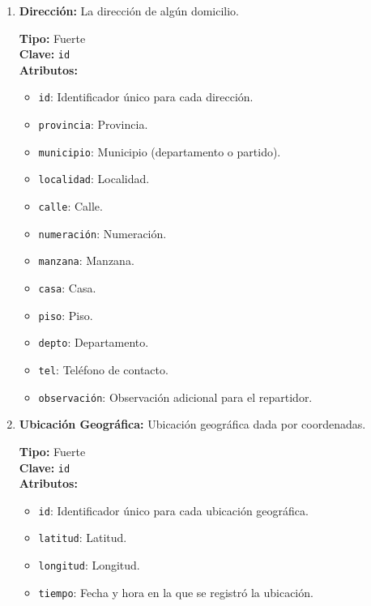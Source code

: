 \begin{enumerate}
    \item \textbf{Dirección:} La dirección de algún domicilio.
    
    \textbf{Tipo:} Fuerte \\
    \textbf{Clave:} \texttt{id} \\
    \textbf{Atributos:}
    \begin{itemize}
        \item \texttt{id}: Identificador único para cada dirección.
        \item \texttt{provincia}: Provincia.
        \item \texttt{municipio}: Municipio (departamento o partido).
        \item \texttt{localidad}: Localidad.
        \item \texttt{calle}: Calle.
        \item \texttt{numeración}: Numeración.
        \item \texttt{manzana}: Manzana.
        \item \texttt{casa}: Casa.
        \item \texttt{piso}: Piso.
        \item \texttt{depto}: Departamento.
        \item \texttt{tel}: Teléfono de contacto.
        \item \texttt{observación}: Observación adicional para el repartidor.
    \end{itemize}
    
    \item \textbf{Ubicación Geográfica:} Ubicación geográfica dada por coordenadas.
    
    \textbf{Tipo:} Fuerte \\
    \textbf{Clave:} \texttt{id} \\
    \textbf{Atributos:}
    \begin{itemize}
        \item \texttt{id}: Identificador único para cada ubicación geográfica.
        \item \texttt{latitud}: Latitud.
        \item \texttt{longitud}: Longitud.
        \item \texttt{tiempo}: Fecha y hora en la que se registró la ubicación.
    \end{itemize}
    

\end{enumerate}
